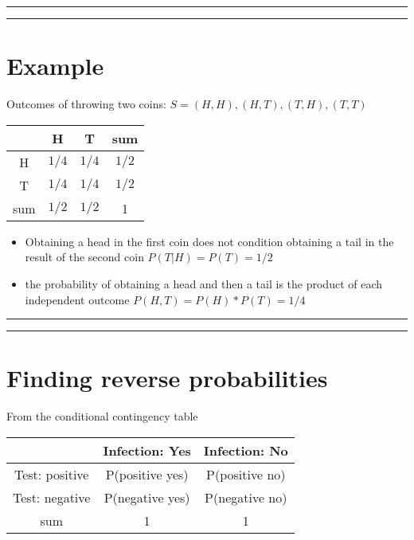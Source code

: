 \documentclass[
]{book}
\providecommand{\tightlist}{%
  \setlength{\itemsep}{0pt}\setlength{\parskip}{0pt}}
\begin{document}
\begin{center}\rule{0.5\linewidth}{0.5pt}\end{center}

\begin{center}\rule{0.5\linewidth}{0.5pt}\end{center}

\hypertarget{example-5}{%
\section{Example}\label{example-5}}

Outcomes of throwing two coins: \(S={(H,H), (H,T), (T,H), (T,T)}\)

\begin{longtable}[]{@{}cccc@{}}
\toprule
& H & T & sum \\
\midrule
\endhead
H & \(1/4\) & \(1/4\) & \(1/2\) \\
T & \(1/4\) & \(1/4\) & \(1/2\) \\
sum & \(1/2\) & \(1/2\) & 1 \\
\bottomrule
\end{longtable}

\begin{itemize}
\tightlist
\item
  Obtaining a head in the first coin does not condition obtaining a tail in the result of the second coin \(P(T|H)=P(T)=1/2\)
\item
  the probability of obtaining a head and then a tail is the product of each independent outcome \(P(H, T)=P(H)*P(T)=1/4\)
\end{itemize}

\begin{center}\rule{0.5\linewidth}{0.5pt}\end{center}

\begin{center}\rule{0.5\linewidth}{0.5pt}\end{center}

\hypertarget{finding-reverse-probabilities}{%
\section{Finding reverse probabilities}\label{finding-reverse-probabilities}}

From the conditional contingency table

\begin{longtable}[]{@{}ccc@{}}
\toprule
& Infection: Yes & Infection: No \\
\midrule
\endhead
Test: positive & P(positive {\textbar{}} yes) & P(positive {\textbar{}} no) \\
Test: negative & P(negative {\textbar{}} yes) & P(negative {\textbar{}} no) \\
sum & 1 & 1 \\
\bottomrule
\end{longtable}
\end{document}
